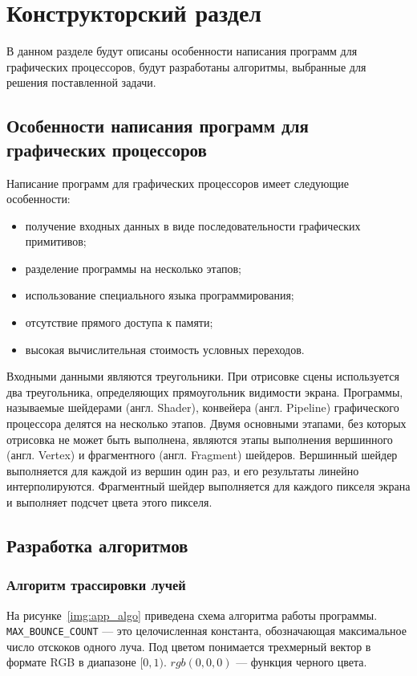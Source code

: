 \chapter{Конструкторский раздел}

В данном разделе будут описаны особенности написания программ для графических процессоров, 
будут разработаны алгоритмы, выбранные для решения поставленной задачи.

\section{Особенности написания программ для графических процессоров}

Написание программ для графических процессоров имеет следующие особенности:
\begin{itemize}
    \item получение входных данных в виде последовательности графических примитивов;
    \item разделение программы на несколько этапов;
    \item использование специального языка программирования;
    \item отсутствие прямого доступа к памяти;
    \item высокая вычислительная стоимость условных переходов.
\end{itemize}

Входными данными являются треугольники. При отрисовке сцены используется два треугольника,
определяющих прямоугольник видимости экрана.
Программы, называемые шейдерами (англ. Shader), конвейера (англ. Pipeline) 
графического процессора делятся на несколько этапов. Двумя основными этапами, 
без которых отрисовка не может быть выполнена, являются этапы выполнения вершинного (англ. Vertex) и 
фрагментного (англ. Fragment) шейдеров. Вершинный шейдер выполняется для каждой из вершин один
раз, и его результаты линейно интерполируются. Фрагментный шейдер
выполняется для каждого пикселя экрана и выполняет подсчет цвета этого пикселя.

\section{Разработка алгоритмов}

\subsection{Алгоритм трассировки лучей}

На рисунке~\ref{img:app_algo} приведена схема алгоритма работы программы.
\verb|MAX_BOUNCE_COUNT| --- это целочисленная константа, обозначающая максимальное число
отскоков одного луча. Под цветом понимается
трехмерный вектор в формате RGB в диапазоне $[0, 1)$. $rgb(0,0,0)$ --- функция черного цвета. 

